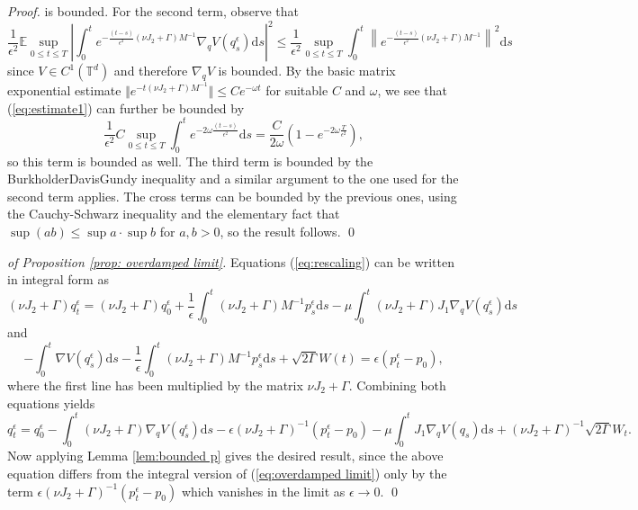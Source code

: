 \begin{proof}
	is bounded. For the second term, observe that 
	\begin{equation}
	\frac{1}{\epsilon^{2}}\mathbb{E}\sup_{0\le t\le T}\left\lvert\int_{0}^{t}e^{-\frac{(t-s)}{\epsilon^{2}}(\nu J_{2}+\Gamma)M^{-1}}\nabla_{q}V(q_{s}^{\epsilon})\mathrm{d}s\right\rvert^{2}\le\frac{1}{\epsilon^{2}}\sup_{0\le t\le T}\int_{0}^{t}\left\lVert e^{-\frac{(t-s)}{\epsilon^{2}}(\nu J_{2}+\Gamma)M^{-1}}\right\rVert^{2}\mathrm{d}s\label{eq:estimate1}
	\end{equation}
	since $V \in C^1(\mathbb{T}^d)$ and therefore $\nabla_{q}V$ is bounded. By the basic matrix exponential estimate
	$\Vert e^{-t(\nu J_{2}+\Gamma)M^{-1}}\Vert\le Ce^{-\omega t}$ for
	suitable $C$ and $\omega$, we see that (\ref{eq:estimate1}) can
	further be bounded by 
	\[
	\frac{1}{\epsilon^{2}}C\sup_{0\le t\le T}\int_{0}^{t}e^{-2\omega\frac{(t-s)}{\epsilon^{2}}}\mathrm{d}s=\frac{C}{2\omega}\left(1-e^{-2\omega\frac{T}{\epsilon^{2}}}\right),
	\]
	so this term is bounded as well. The third term is bounded by the
	Burkholder\textendash Davis\textendash Gundy inequality and a similar
	argument to the one used for the second term applies. The cross terms can
	be bounded by the previous ones, using the Cauchy-Schwarz inequality
	and the elementary fact that $\sup(ab)\le\sup a\cdot\sup b$ for $a,b>0$, so the
	result follows. \qed
\end{proof}

\begin{proof}
	[of Proposition \ref{prop: overdamped limit}] Equations (\ref{eq:rescaling})
	can be written in integral form as
	\[
	(\nu J_{2}+\Gamma)q_{t}^{\epsilon}=(\nu J_{2}+\Gamma)q_{0}^{\epsilon}+\frac{1}{\epsilon}\int_{0}^{t}(\nu J_{2}+\Gamma)M^{-1}p_{s}^{\epsilon}\mathrm{d}s-\mu\int_{0}^{t}(\nu J_{2}+\Gamma)J_{1}\nabla_{q}V(q_{s}^{\epsilon})\mathrm{d}s
	\]
	and 
	\begin{equation}
	-\int_{0}^{t}\nabla V(q_{s}^{\epsilon})\mathrm{d}s-\frac{1}{\epsilon}\int_{0}^{t}(\nu J_{2}+\Gamma)M^{-1}p_{s}^{\epsilon}\mathrm{d}s+\sqrt{2\Gamma}W(t)=\epsilon(p_{t}^{\epsilon}-p_{0}),\label{eq:rescaled p equation-1}
	\end{equation}
	where the first line has been multiplied by the matrix $\nu J_{2}+\Gamma$.
	Combining both equations yields
	\[
	q_{t}^{\epsilon}=q_{0}^{\epsilon}-\int_{0}^{t}(\nu J_{2}+\Gamma)\nabla_{q}V(q_{s}^{\epsilon})\mathrm{d}s-\epsilon(\nu J_{2}+\Gamma)^{-1}(p_{t}^{\epsilon}-p_{0})-\mu\int_{0}^{t}J_{1}\nabla_{q}V(q_{s})\mathrm{d}s+(\nu J_{2}+\Gamma)^{-1}\sqrt{2\Gamma}W_{t}.
	\]
	Now applying Lemma \ref{lem:bounded p} gives the desired result,
	since the above equation differs from the integral version of (\ref{eq:overdamped limit})
	only by the term $\epsilon(\nu J_{2}+\Gamma)^{-1}(p_{t}^{\epsilon}-p_{0})$
	which vanishes in the limit as $\epsilon\rightarrow0$. \qed
\end{proof}

